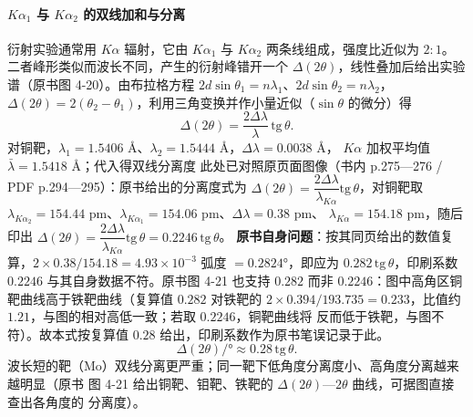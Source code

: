 \paragraph{$K\alpha_{1}$ 与 $K\alpha_{2}$ 的双线加和与分离}
\begin{principle}
衍射实验通常用 $K\alpha$ 辐射，它由 $K\alpha_{1}$ 与 $K\alpha_{2}$ 两条线组成，强度比近似为
$2:1$。二者峰形类似而波长不同，产生的衍射峰错开一个 $\Delta(2\theta)$，线性叠加后给出实验
谱（原书图 4-20）。由布拉格方程 $2d\sin\theta_{1}=n\lambda_{1}$、$2d\sin\theta_{2}=n\lambda_{2}$，
$\Delta(2\theta)=2(\theta_{2}-\theta_{1})$，利用三角变换并作小量近似（$\sin\theta$ 的微分）得
\begin{equation}
\Delta(2\theta)=\frac{2\Delta\lambda}{\lambda}\,\mathrm{tg}\,\theta .
\label{eq:ch04c-doublet}
\end{equation}
对铜靶，$\lambda_{1}=1.5406$ Å、$\lambda_{2}=1.5444$ Å，$\Delta\lambda=0.0038$ Å，
$K\alpha$ 加权平均值 $\bar{\lambda}=1.5418$ Å；代入得双线分离度
此处已对照原页面图像（书内 p.275—276 / PDF p.294—295）：原书给出的分离度式为
$\Delta(2\theta)=\dfrac{2\Delta\lambda}{\lambda_{K\alpha}}\mathrm{tg}\,\theta$，对铜靶取
$\lambda_{K\alpha_{2}}=154.44$ pm、$\lambda_{K\alpha_{1}}=154.06$ pm、$\Delta\lambda=0.38$ pm、
$\lambda_{K\alpha}=154.18$ pm，随后印出
$\Delta(2\theta)=\dfrac{2\Delta\lambda}{\lambda_{K\alpha}}\mathrm{tg}\,\theta=0.2246\,\mathrm{tg}\,\theta$。
\textbf{原书自身问题}：按其同页给出的数值复算，$2\times0.38/154.18=4.93\times10^{-3}$ 弧度
$=0.2824°$，即应为 $0.282\,\mathrm{tg}\,\theta$，印刷系数 $0.2246$ 与其自身数据不符。原书图 4-21
也支持 $0.282$ 而非 $0.2246$：图中高角区铜靶曲线高于铁靶曲线（复算值 $0.282$ 对铁靶的
$2\times0.394/193.735=0.233$，比值约 $1.21$，与图的相对高低一致；若取 $0.2246$，铜靶曲线将
反而低于铁靶，与图不符）。故本式按复算值 $0.28$ 给出，印刷系数作为原书笔误记录于此。
\begin{equation}
\Delta(2\theta)\big/°\approx0.28\,\mathrm{tg}\,\theta .
\label{eq:ch04c-doubletnum}
\end{equation}
波长短的靶（Mo）双线分离更严重；同一靶下低角度分离度小、高角度分离越来越明显（原书
图 4-21 给出铜靶、钼靶、铁靶的 $\Delta(2\theta)$—$2\theta$ 曲线，可据图直接查出各角度的
分离度）。
\end{principle}

